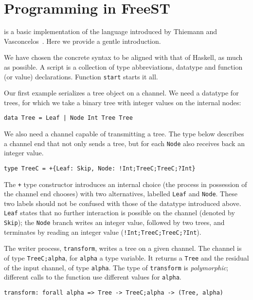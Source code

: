 \section{Programming in FreeST}
\label{sec:programming}

\freest{} is a basic implementation of the language introduced by
Thiemann and Vasconcelos~\cite{DBLP:conf/icfp/ThiemannV16}. Here we
provide a gentle introduction.

We have chosen the concrete syntax to be aligned with that of Haskell,
as much as possible. A \freest{} script is a collection of type
abbreviations, datatype and function (or value) declarations. Function
\lstinline|start| starts it all.

Our first example serializes a tree object on a channel. We need a
datatype for trees, for which we take a binary tree with integer
values on the internal nodes:
%
\begin{lstlisting}
data Tree = Leaf | Node Int Tree Tree
\end{lstlisting}

We also need a channel capable of transmitting a tree. The type below
describes a channel end that not only sends a tree, but for each
\lstinline|Node| also receives back an integer value.
%
\begin{lstlisting}
type TreeC = +{Leaf: Skip, Node: !Int;TreeC;TreeC;?Int}
\end{lstlisting}

The \lstinline|+| type constructor introduces an internal choice (the
process in possession of the channel end chooses) with two
alternatives, labelled \lstinline|Leaf| and \lstinline|Node|. These
two labels should not be confused with those of the datatype
introduced above. \lstinline|Leaf| states that no further interaction
is possible on the channel (denoted by \lstinline|Skip|); the
\lstinline|Node| branch writes an integer value, followed by two
trees, and terminates by reading an integer value
(\lstinline|!Int;TreeC;TreeC;?Int|).

The writer process, \lstinline|transform|, writes a tree on a given
channel. The channel is of type \lstinline|TreeC;alpha|, for
\lstinline|alpha| a type variable. It returns a \lstinline|Tree| and
the residual of the input channel, of type \lstinline|alpha|. The type
of \lstinline|transform| is \emph{polymorphic}; different calls to the
function use different values for \lstinline|alpha|.

\begin{lstlisting}
transform: forall alpha => Tree -> TreeC;alpha -> (Tree, alpha)
\end{lstlisting}

